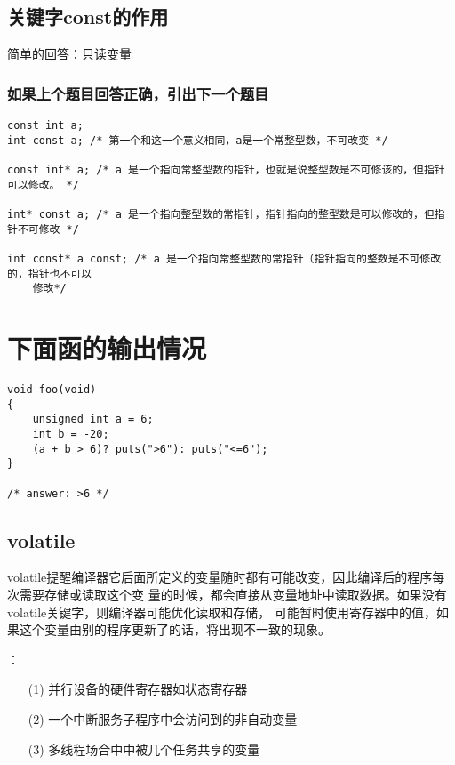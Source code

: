 \documentclass{article}
\begin{document}
\subsection{关键字const的作用}
简单的回答：只读变量
\subsubsection{如果上个题目回答正确，引出下一个题目}
\begin{verbatim}
const int a; 
int const a; /* 第一个和这一个意义相同，a是一个常整型数，不可改变 */

const int* a; /* a 是一个指向常整型数的指针，也就是说整型数是不可修该的，但指针可以修改。 */

int* const a; /* a 是一个指向整型数的常指针，指针指向的整型数是可以修改的，但指针不可修改 */

int const* a const; /* a 是一个指向常整型数的常指针（指针指向的整数是不可修改的，指针也不可以
	修改*/ 
\end{verbatim}

\section{下面函的输出情况}
\begin{verbatim}
void foo(void)
{
	unsigned int a = 6;
	int b = -20;
	(a + b > 6)? puts(">6"): puts("<=6");
}

/* answer: >6 */

\end{verbatim}

\subsection{volatile}
volatile提醒编译器它后面所定义的变量随时都有可能改变，因此编译后的程序每次需要存储或读取这个变
量的时候，都会直接从变量地址中读取数据。如果没有volatile关键字，则编译器可能优化读取和存储，
可能暂时使用寄存器中的值，如果这个变量由别的程序更新了的话，将出现不一致的现象。


：

\begin{itemize}
\item[(1)] 并行设备的硬件寄存器如状态寄存器
\item[(2)] 一个中断服务子程序中会访问到的非自动变量
\item[(3)] 多线程场合中中被几个任务共享的变量
\end{itemize}
\end{document}
